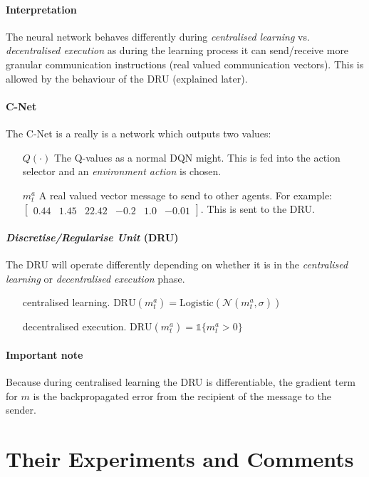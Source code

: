 \documentclass{article}
\begin{document}
    \paragraph{Interpretation} The neural network behaves differently during \emph{centralised learning} vs. \emph{decentralised execution} as during the learning process it can send/receive more granular communication instructions (real valued communication vectors). This is allowed by the behaviour of the DRU (explained later).

    \paragraph{C-Net} The C-Net is a really is a network which outputs two values:
    \begin{enumerate}
        \item[$Q(\cdot)$] The Q-values as a normal DQN might. This is fed into the action selector and an \emph{environment action} is chosen.
        \item[$m^a_t$] A real valued vector message to send to other agents. For example: $\begin{bmatrix} 0.44 & 1.45 & 22.42 & -0.2 & 1.0 & -0.01 \end{bmatrix}$. This is sent to the DRU.
    \end{enumerate}
    \paragraph{\emph{Discretise/Regularise Unit} (DRU)} The DRU will operate differently depending on whether it is in the \emph{centralised learning} or \emph{decentralised execution} phase. 
      
    \begin{enumerate}
        \item[centralised learning.] $\text{DRU}(m^a_t) = \text{Logistic}(\mathcal{N}(m^a_t, \sigma))$
        \item[decentralised execution.] $\text{DRU}(m^a_t) = \mathds{1} \{ m^a_t > 0 \}$
    \end{enumerate}
    
    \paragraph{Important note}
    Because during centralised learning the DRU is differentiable, the gradient term for $m$ is the backpropagated error from the recipient of the message to the sender.
    
    \section{Their Experiments and Comments}

    
\end{document}
